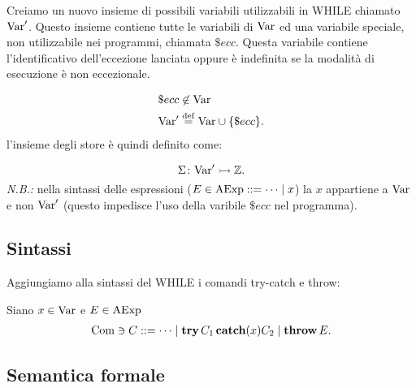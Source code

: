 Creiamo un nuovo insieme di possibili variabili utilizzabili in WHILE
chiamato $\mathrm{Var}'$. Questo insieme contiene tutte le variabili di $\mathrm{Var}$
ed una variabile speciale, non utilizzabile nei programmi, chiamata
$\$ecc$. Questa variabile contiene l'identificativo dell'eccezione
lanciata oppure è indefinita se la modalità di esecuzione è non
eccezionale.

\begin{align*}
  &\$ecc \not \in \Var \\
  &\Var' \defeq \Var \union \{\$ecc\}.
\end{align*}
l'insieme degli store è quindi definito come:

\[
  \mathord{\Sigma}\colon\mathrm{Var}'\rightarrowtail\mathbb{Z}.
\]
\emph{N.B.:} nella sintassi delle espressioni ($E \in \AExp ::= \dots
\vbar x$) la $x$ appartiene a $\mathrm{Var}$ e non $\mathrm{Var}'$ (questo
impedisce l'uso della varibile $\$ecc$ nel programma).

\subsection{Sintassi}
Aggiungiamo alla sintassi del WHILE i comandi try-catch e throw:

Siano $x \in \mathrm{Var}$ e $E \in \mathrm{AExp}$
\begin{align*}
\Com \ni C ::= \dots \vbar \kw{try} C_1 \kw{catch}(x) C_2\vbar \kw{throw} E.
\end{align*}

\subsection{Semantica formale}

